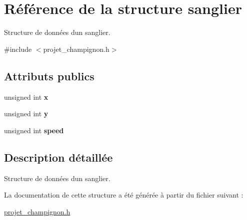 \hypertarget{structsanglier}{}\section{Référence de la structure sanglier}
\label{structsanglier}


Structure de données d\textquotesingle{}un sanglier.  




{\ttfamily \#include $<$projet\+\_\+champignon.\+h$>$}

\subsection*{Attributs publics}
\begin{DoxyCompactItemize}
\item 
\hypertarget{structsanglier_ab3845029d72e2d99d82f1dfd1178431a}{}\label{structsanglier_ab3845029d72e2d99d82f1dfd1178431a} 
unsigned int {\bfseries x}
\item 
\hypertarget{structsanglier_a84ed06b1477eacd4c0d7c2b0ea53e632}{}\label{structsanglier_a84ed06b1477eacd4c0d7c2b0ea53e632} 
unsigned int {\bfseries y}
\item 
\hypertarget{structsanglier_affa083486a892d7112c613addfea1be1}{}\label{structsanglier_affa083486a892d7112c613addfea1be1} 
unsigned int {\bfseries speed}
\end{DoxyCompactItemize}


\subsection{Description détaillée}
Structure de données d\textquotesingle{}un sanglier. 

La documentation de cette structure a été générée à partir du fichier suivant \+:\begin{DoxyCompactItemize}
\item 
\hyperlink{projet__champignon_8h}{projet\+\_\+champignon.\+h}\end{DoxyCompactItemize}

